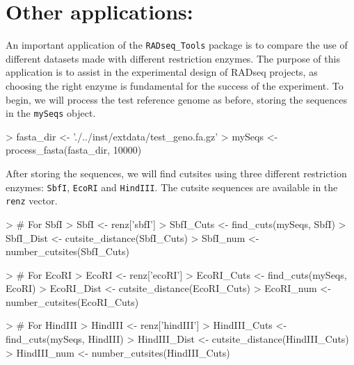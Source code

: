 \documentclass{article}
\begin{document}
\section{Other applications:}
An important application of the \texttt{RADseq\_Tools} package is to compare the use of different datasets made with different restriction enzymes. The purpose of this application is to assist in the experimental design of RADseq projects, as choosing the right enzyme is fundamental for the success of the experiment. 
\bigbreak
To begin, we will process the test reference genome as before, storing the sequences in the \texttt{mySeqs} object. 
\begin{Schunk}
\begin{Sinput}
> fasta_dir <- './../inst/extdata/test_geno.fa.gz'
> mySeqs <- process_fasta(fasta_dir, 10000)
\end{Sinput}
\end{Schunk}

After storing the sequences, we will find cutsites using three different restriction enzymes: \texttt{SbfI}, \texttt{EcoRI} and \texttt{HindIII}. The cutsite sequences are available in the \texttt{renz} vector. 
\begin{Schunk}
\begin{Sinput}
> # For SbfI
> SbfI <- renz['sbfI']
> SbfI_Cuts <- find_cuts(mySeqs, SbfI)
> SbfI_Dist <- cutsite_distance(SbfI_Cuts)
> SbfI_num <- number_cutsites(SbfI_Cuts)
\end{Sinput}
\end{Schunk}
\begin{Schunk}
\begin{Sinput}
> # For EcoRI
> EcoRI <- renz['ecoRI']
> EcoRI_Cuts <- find_cuts(mySeqs, EcoRI)
> EcoRI_Dist <- cutsite_distance(EcoRI_Cuts)
> EcoRI_num <- number_cutsites(EcoRI_Cuts)
\end{Sinput}
\end{Schunk}
\begin{Schunk}
\begin{Sinput}
> # For HindIII
> HindIII <- renz['hindIII']
> HindIII_Cuts <- find_cuts(mySeqs, HindIII)
> HindIII_Dist <- cutsite_distance(HindIII_Cuts)
> HindIII_num <- number_cutsites(HindIII_Cuts)
\end{Sinput}
\end{Schunk}
\end{document}
